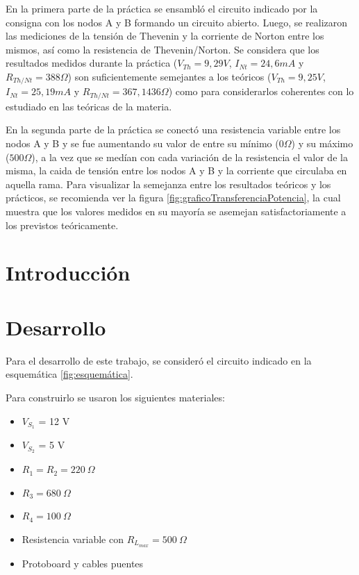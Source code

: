 \documentclass{article}
\begin{document}
        En la primera parte de la práctica se ensambló el circuito indicado por la consigna con los nodos A y B formando un circuito abierto. Luego, se
        realizaron las mediciones de la tensión de Thevenin y la corriente de Norton entre los mismos, así como la resistencia de Thevenin/Norton. 
        Se considera que los resultados medidos durante la práctica ($V_{Th} = 9,29V$, $I_{Nt} = 24,6 mA$ y $R_{Th/Nt} = 388 \Omega$) son suficientemente 
        semejantes a los teóricos ($V_{Th} = 9,25 V$, $I_{Nt} = 25,19 mA$ y $R_{Th/Nt} = 367,1436 \Omega$) como para considerarlos coherentes con lo 
        estudiado en las teóricas de la materia.  \par

        En la segunda parte de la práctica se conectó una resistencia variable entre los nodos A y B y se fue aumentando su valor de entre su mínimo 
        ($0 \Omega$) y su máximo ($500 \Omega$), a la vez que se medían con cada variación de la resistencia el valor de la misma, la caida de
        tensión entre los nodos A y B y la corriente que circulaba en aquella rama. Para visualizar la semejanza entre los resultados teóricos y los 
        prácticos, se recomienda ver la figura \ref{fig:graficoTransferenciaPotencia}, la cual muestra que los valores medidos en su mayoría se asemejan
        satisfactoriamente a los previstos teóricamente. \par



    \newpage

    \tableofcontents %
    \newpage

    \section{Introducción}

    \indent
    \section{Desarrollo}
        \quad Para el desarrollo de este trabajo, se consideró el circuito indicado en la esquemática \autoref{fig:esquemática}.\par
        Para construirlo se usaron los siguientes materiales:\par
        
            	\begin{itemize}
                \item $V_{S_{1}}$ = 12 V
                \item $V_{S_{2}}$ = 5 V
                \item $R_{1} = R_{2} = 220 ~\Omega $
                \item $R_{3} = 680~ \Omega $
                \item $R_{4} = 100~ \Omega $
                \item Resistencia variable con $R_{L_{max}} = 500~\Omega$
                \item Protoboard y cables puentes
                \end{itemize}
        
\end{document}
